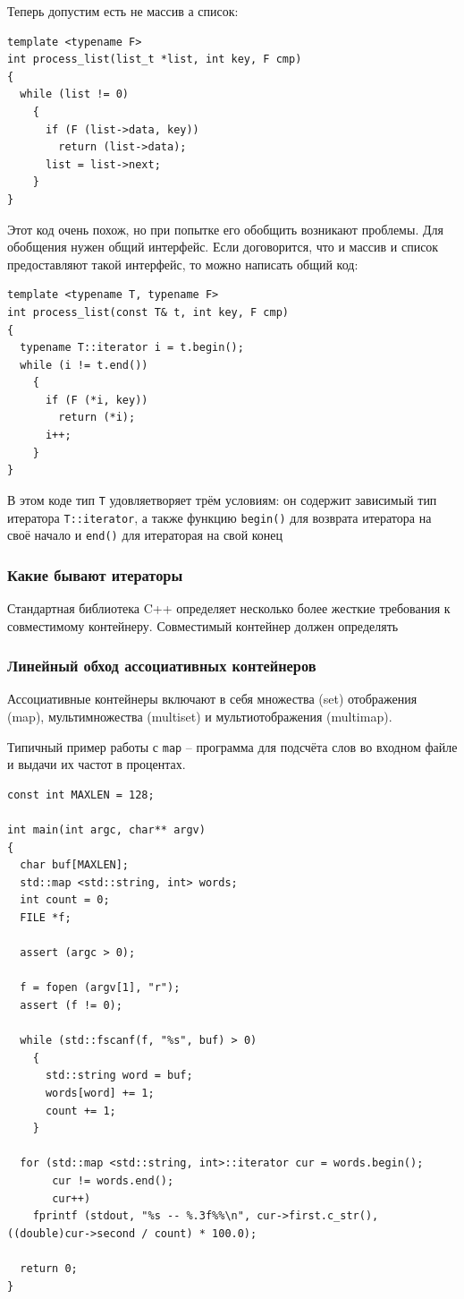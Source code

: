 \documentclass[a4paper,12pt,oneside]{article}
\begin{document}
Теперь допустим есть не массив а список:

\begin{lstlisting}
template <typename F>
int process_list(list_t *list, int key, F cmp)
{
  while (list != 0)
    {
      if (F (list->data, key)) 
        return (list->data);
      list = list->next;
    }  
}
\end{lstlisting}

Этот код очень похож, но при попытке его обобщить возникают проблемы. Для обобщения нужен общий интерфейс. Если договорится, что и массив и список предоставляют такой интерфейс, то можно написать общий код:

\begin{lstlisting}
template <typename T, typename F>
int process_list(const T& t, int key, F cmp)
{
  typename T::iterator i = t.begin();
  while (i != t.end())
    {
      if (F (*i, key)) 
        return (*i);
      i++;
    }  
}
\end{lstlisting}

В этом коде тип \lstinline!T! удовляетворяет трём условиям: он содержит зависимый тип итератора \lstinline!T::iterator!, а также функцию \lstinline!begin()! для возврата итератора на своё начало и \lstinline!end()! для итераторая на свой конец

\subsubsection{Какие бывают итераторы}

Стандартная библиотека C++ определяет несколько более жесткие требования к совместимому контейнеру. Совместимый контейнер должен определять

\subsubsection{Линейный обход ассоциативных контейнеров}

Ассоциативные контейнеры включают в себя множества (set) отображения (map), мультимножества (multiset) и мультиотображения (multimap).

Типичный пример работы с \lstinline!map! -- программа для подсчёта слов во входном файле и выдачи их частот в процентах.

\begin{lstlisting}
const int MAXLEN = 128;

int main(int argc, char** argv)
{
  char buf[MAXLEN];
  std::map <std::string, int> words;
  int count = 0;
  FILE *f;

  assert (argc > 0);

  f = fopen (argv[1], "r");
  assert (f != 0);

  while (std::fscanf(f, "%s", buf) > 0)
    {
      std::string word = buf;
      words[word] += 1;
      count += 1;
    }

  for (std::map <std::string, int>::iterator cur = words.begin();
       cur != words.end();
       cur++)
    fprintf (stdout, "%s -- %.3f%%\n", cur->first.c_str(), ((double)cur->second / count) * 100.0);

  return 0;
}
\end{lstlisting}
\end{document}
